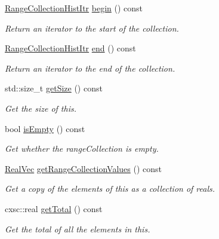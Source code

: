\begin{DoxyCompactItemize}
\hyperlink{classsubpavings_1_1RangeCollectionHist_a65d6a1cb899b673b28913a7dfb572476}{\-Range\-Collection\-Hist\-Itr} \hyperlink{classsubpavings_1_1RangeCollectionHist_adbd68fcd7515aeb084af67cbe946e162}{begin} () const 
\begin{DoxyCompactList}\small\item\em \-Return an iterator to the start of the collection. \end{DoxyCompactList}\item 
\hyperlink{classsubpavings_1_1RangeCollectionHist_a65d6a1cb899b673b28913a7dfb572476}{\-Range\-Collection\-Hist\-Itr} \hyperlink{classsubpavings_1_1RangeCollectionHist_ab19aefc62a7559964b43e24f352063e3}{end} () const 
\begin{DoxyCompactList}\small\item\em \-Return an iterator to the end of the collection. \end{DoxyCompactList}\item 
std\-::size\-\_\-t \hyperlink{classsubpavings_1_1RangeCollectionHist_a1d771d4ec07fd09a078615c599dbd81c}{get\-Size} () const 
\begin{DoxyCompactList}\small\item\em \-Get the size of this. \end{DoxyCompactList}\item 
bool \hyperlink{classsubpavings_1_1RangeCollectionHist_a49d8516732a4d2d4e7a5863a502c0fda}{is\-Empty} () const 
\begin{DoxyCompactList}\small\item\em \-Get whether the range\-Collection is empty. \end{DoxyCompactList}\item 
\hyperlink{namespacesubpavings_af2d57bb6e12f4a73169f2e496d6a641f}{\-Real\-Vec} \hyperlink{classsubpavings_1_1RangeCollectionHist_abf9c11987119de78dce7b2ebf0c9b17a}{get\-Range\-Collection\-Values} () const 
\begin{DoxyCompactList}\small\item\em \-Get a copy of the elements of this as a collection of reals. \end{DoxyCompactList}\item 
cxsc\-::real \hyperlink{classsubpavings_1_1RangeCollectionHist_aaee124fc1435e538fc2bb8c799032c2c}{get\-Total} () const 
\begin{DoxyCompactList}\small\item\em \-Get the total of all the elements in this. \end{DoxyCompactList}\item 

\end{DoxyCompactItemize}
